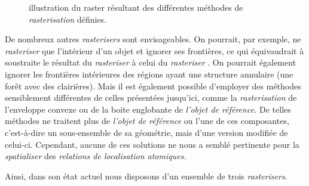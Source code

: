 \begin{figure}
  \centering
  
  \caption{illustration du raster résultant des différentes méthodes
    de \emph{rasterisation} définies.}
  \label{fig:methode_rasterisation}
\end{figure}

De nombreux autres \emph{rasterisers} sont envisageables. On pourrait,
par exemple, ne \emph{rasteriser} que l'intérieur d'un objet et
ignorer ses frontières, ce qui équivaudrait à soustraite le résultat
du \emph{rasteriser}  à celui du \emph{rasteriser}
. On pourrait également ignorer les frontières
intérieures des régions ayant une structure annulaire (\eg une forêt
avec des clairières). Mais il est également possible d'employer des
méthodes sensiblement différentes de celles présentées jusqu'ici,
comme la \emph{rasterisation} de l'enveloppe convexe ou de la boite
englobante de \emph{l'objet de référence.} De telles méthodes ne
traitent plus de \emph{l'objet de référence} ou l'une de ces
composantes, c'est-à-dire un sous-ensemble de sa géométrie, mais d'une
version modifiée de celui-ci. Cependant, aucune de ces solutions ne
nous a semblé pertinente pour la \emph{spatialiser} des
\emph{relations de localisation atomiques.}

Ainsi, dans son état actuel nous disposons d'un ensemble de trois
\emph{rasterisers.}

